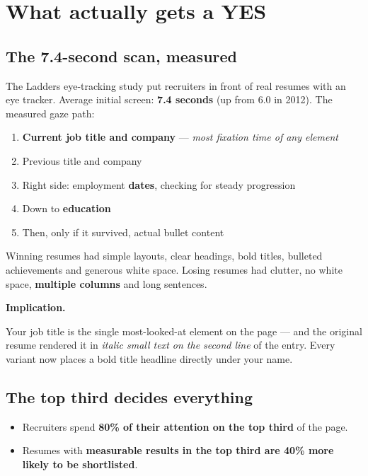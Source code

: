 \documentclass[11pt,a4paper]{article}
\newcommand{\keyfinding}[1]{\par\vspace{3pt}\noindent\textcolor{warn}{\textbf{#1}}\par\vspace{2pt}}
\begin{document}
\section{What actually gets a YES}

\subsection{The 7.4-second scan, measured}

The Ladders eye-tracking study put recruiters in front of real resumes with an eye tracker.
Average initial screen: \textbf{7.4 seconds} (up from 6.0 in 2012). The measured gaze path:

\begin{enumerate}
  \item \textbf{Current job title and company} --- \emph{most fixation time of any element}
  \item Previous title and company
  \item Right side: employment \textbf{dates}, checking for steady progression
  \item Down to \textbf{education}
  \item Then, only if it survived, actual bullet content
\end{enumerate}

Winning resumes had simple layouts, clear headings, bold titles, bulleted achievements and
generous white space. Losing resumes had clutter, no white space, \textbf{multiple columns}
and long sentences.

\keyfinding{Implication.}
Your job title is the single most-looked-at element on the page --- and the original resume
rendered it in \emph{italic small text on the second line} of the entry. Every variant now
places a bold title headline directly under your name.

\subsection{The top third decides everything}
\begin{itemize}
  \item Recruiters spend \textbf{80\% of their attention on the top third} of the page.
  \item Resumes with \textbf{measurable results in the top third are 40\% more likely to be
        shortlisted}.
\end{itemize}
\end{document}
